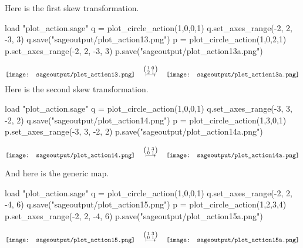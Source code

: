 Here is the first skew
transformation. 
\begin{sageoutput}[d,0,4;d,5,7]
load "plot_action.sage"
q = plot_circle_action(1,0,0,1) 
q.set_axes_range(-2, 2, -3, 3) 
q.save("sageoutput/plot_action13.png")
p = plot_circle_action(1,0,2,1) 
p.set_axes_range(-2, 2, -3, 3) 
p.save("sageoutput/plot_action13a.png")
\end{sageoutput}
\begin{equation*}
  \vcenteredhbox{\texttt{[image: sageoutput/plot\_action13.png]}}
  \quad\mapsunder{\big (\begin{smallmatrix} 1 &0 \\ 2 &1 \end{smallmatrix}\big )}\quad
  \vcenteredhbox{\texttt{[image: sageoutput/plot\_action13a.png]}}
\end{equation*}
\noindent Here is the second skew
transformation. 
\begin{sageoutput}[d,0,4;d,5,7]
load "plot_action.sage"
q = plot_circle_action(1,0,0,1) 
q.set_axes_range(-3, 3, -2, 2) 
q.save("sageoutput/plot_action14.png")
p = plot_circle_action(1,3,0,1) 
p.set_axes_range(-3, 3, -2, 2) 
p.save("sageoutput/plot_action14a.png")
\end{sageoutput}
\begin{equation*}
  \vcenteredhbox{\texttt{[image: sageoutput/plot\_action14.png]}}
  \quad\mapsunder{\big (\begin{smallmatrix} 1 &3 \\ 0 &1 \end{smallmatrix}\big )}\quad
  \vcenteredhbox{\texttt{[image: sageoutput/plot\_action14a.png]}}
\end{equation*}

And here is the generic map.
\begin{sageoutput}[d,0,4;d,5,7]
load "plot_action.sage"
q = plot_circle_action(1,0,0,1) 
q.set_axes_range(-2, 2, -4, 6) 
q.save("sageoutput/plot_action15.png")
p = plot_circle_action(1,2,3,4) 
p.set_axes_range(-2, 2, -4, 6) 
p.save("sageoutput/plot_action15a.png")
\end{sageoutput}
\begin{equation*}
  \vcenteredhbox{\texttt{[image: sageoutput/plot\_action15.png]}}
  \quad\mapsunder{\big (\begin{smallmatrix} 1 &3 \\ 0 &1 \end{smallmatrix}\big )}\quad
  \vcenteredhbox{\texttt{[image: sageoutput/plot\_action15a.png]}}
\end{equation*}


